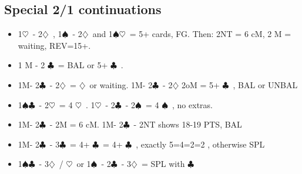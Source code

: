 \documentclass{article}
\newcommand\C{\ensuremath{\clubsuit}}
\newcommand\D{\ensuremath{\diamondsuit}}
\renewcommand\H{\ensuremath{\heartsuit}}
\renewcommand\S{\ensuremath{\spadesuit}}
\begin{document}
\begin{multicols}{2}
  \subsection{Special 2/1 continuations}
  \label{2over1}
  \begin{itemize}
    \item 1\H\ - 2\D\ ,  1\S\ - 2\D\ and 1\S{}\H\ = 5+ cards, FG. Then: 2NT = 6 cM, 2 M = waiting, REV=15+.
    \item 1 M - 2 \C\ = BAL or 5+ \C\ .
    \item 1M- 2\C\ - 2\D\ = \D\ or waiting. 1M- 2\C\ - 2\D\- 2oM = 5+ \C\ , BAL or UNBAL
    \item 1\S{}\C\ - 2\H\ = 4 \H\ . 1\H\ - 2\C\ - 2\S\ = 4 \S\ , no extras.
    \item 1M- 2\C\ - 2M = 6 cM. 1M- 2\C\ - 2NT shows 18-19 PTS, BAL
    \item 1M- 2\C\ - 3\C\ = 4+ \C\ = 4+ \C\ , exactly 5=4=2=2 , otherwise SPL
    \item 1\S{}\C\ - 3\D\ / \H\  or 1\S\ - 2\C\ - 3\D\ = SPL with \C\ 
    \end{itemize}

\end{multicols}
\end{document}
